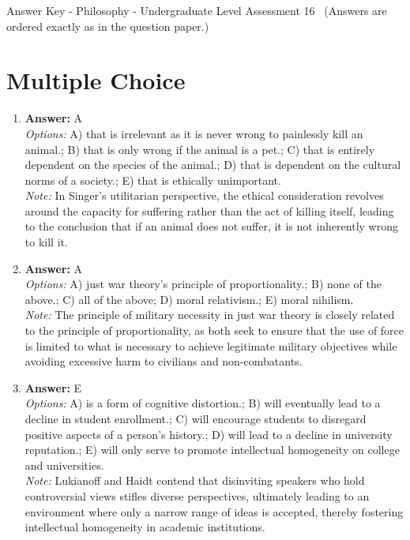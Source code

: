 \documentclass[12pt]{article}
\begin{document}
\begin{center}
Answer Key - Philosophy - Undergraduate Level Assessment 16 \
\small (Answers are ordered exactly as in the question paper.)
\end{center}

\section*{Multiple Choice}
\begin{enumerate}[label=\arabic*.]
\item \textbf{Answer:} A
\\ \textit{Options:} A) that is irrelevant as it is never wrong to painlessly kill an animal.; B) that is only wrong if the animal is a pet.; C) that is entirely dependent on the species of the animal.; D) that is dependent on the cultural norms of a society.; E) that is ethically unimportant.
\\ \textit{Note:} In Singer's utilitarian perspective, the ethical consideration revolves around the capacity for suffering rather than the act of killing itself, leading to the conclusion that if an animal does not suffer, it is not inherently wrong to kill it.
\item \textbf{Answer:} A
\\ \textit{Options:} A) just war theory's principle of proportionality.; B) none of the above.; C) all of the above; D) moral relativism.; E) moral nihilism.
\\ \textit{Note:} The principle of military necessity in just war theory is closely related to the principle of proportionality, as both seek to ensure that the use of force is limited to what is necessary to achieve legitimate military objectives while avoiding excessive harm to civilians and non-combatants.
\item \textbf{Answer:} E
\\ \textit{Options:} A) is a form of cognitive distortion.; B) will eventually lead to a decline in student enrollment.; C) will encourage students to disregard positive aspects of a person's history.; D) will lead to a decline in university reputation.; E) will only serve to promote intellectual homogeneity on college and universities.
\\ \textit{Note:} Lukianoff and Haidt contend that disinviting speakers who hold controversial views stifles diverse perspectives, ultimately leading to an environment where only a narrow range of ideas is accepted, thereby fostering intellectual homogeneity in academic institutions.

\end{enumerate}
\end{document}
